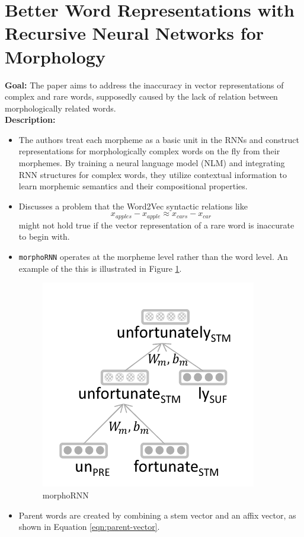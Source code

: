 \documentclass[11pt,a4paper]{article}
\begin{document}


\section{Better Word Representations with Recursive Neural Networks for Morphology} %
\label{sec:better_word_representations_with_recursive_neural_networks_for_morphology}

  \textbf{Goal:}
  The paper aims to address the inaccuracy in vector representations of complex and rare words, supposedly caused by the lack of relation between morphologically related words\cite{luong2013better}.\\

  \textbf{Description:}
  \begin{itemize}
    \item
    The authors treat each morpheme as a basic unit in the RNNs and construct representations for morphologically complex words on the fly from their morphemes. By training a neural language model (NLM) and integrating RNN structures for complex words, they utilize contextual information to learn morphemic semantics and their compositional properties.
    \item
    Discusses a problem that the Word2Vec syntactic relations like $$x_{apples} - x_{apple} \approx x_{cars} - x_{car}$$ might not hold true if the vector representation of a rare word is inaccurate to begin with.
    \item
    \texttt{morphoRNN} operates at the morpheme level rather than the word level. An example of the this is illustrated in Figure \ref{fig:rnn-morphology}.
    \begin{figure}[ht]
      \centering
      \includegraphics[width=.4\textwidth]{rnn-morphology.png}
      \caption{morphoRNN}
      \label{fig:rnn-morphology}
    \end{figure}
    \item
    Parent words are created by combining a stem vector and an affix vector, as shown in Equation \ref{eqn:parent-vector}.

\end{itemize}
\end{document}
